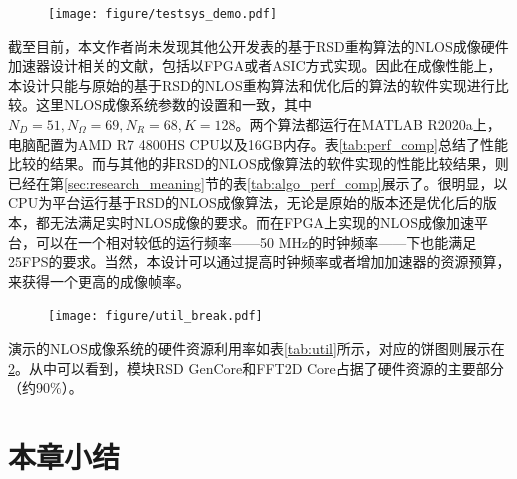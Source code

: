 \documentclass[master]{shtthesis}             %
\begin{document}
\begin{figure}[!tb]
  \centering
  \texttt{[image: figure/testsys\_demo.pdf]}
  \label{fig:testsys}
\end{figure}

截至目前，本文作者尚未发现其他公开发表的基于RSD重构算法的NLOS成像硬件加速器设计相关的文献，包括以FPGA或者ASIC方式实现。因此在成像性能上，本设计只能与原始的基于RSD的NLOS重构算法和优化后的算法的软件实现进行比较。这里NLOS成像系统参数的设置和\citet{Liu}一致，其中$N_D=51, N_\Omega=69, N_R=68, K=128$。两个算法都运行在MATLAB R2020a上，电脑配置为AMD R7 4800HS CPU以及16GB内存。表\ref{tab:perf_comp}总结了性能比较的结果。而与其他的非RSD的NLOS成像算法的软件实现的性能比较结果，则已经在第\ref{sec:research_meaning}节的表\ref{tab:algo_perf_comp}展示了。很明显，以CPU为平台运行基于RSD的NLOS成像算法，无论是原始的版本还是优化后的版本，都无法满足实时NLOS成像的要求。而在FPGA上实现的NLOS成像加速平台，可以在一个相对较低的运行频率——50 MHz的时钟频率——下也能满足25FPS的要求。当然，本设计可以通过提高时钟频率或者增加加速器的资源预算，来获得一个更高的成像帧率。
\begin{table}[!t]
    \centering
    \label{tab:util}
\end{table}
\begin{figure}[!tb]
    \centering
    \texttt{[image: figure/util\_break.pdf]}
    \label{fig:util_break}
\end{figure}

演示的NLOS成像系统的硬件资源利用率如表\ref{tab:util}所示，对应的饼图则展示在\ref{fig:util_break}。从中可以看到，模块RSD GenCore和FFT2D Core占据了硬件资源的主要部分（约90\%）。

\section{本章小结}
\end{document}
